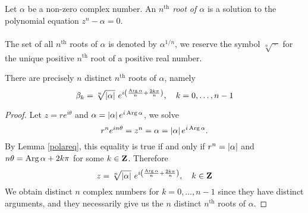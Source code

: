 \medskip

\begin{definition}[Roots]
Let $\alpha$ be a non-zero complex number. An \emph{$n^{\text{th}}$ root of $\alpha$} is a solution to the polynomial equation $z^n - \alpha = 0$.\\
\\
The set of all $n^{\text{th}}$ roots of $\alpha$ is denoted by $\alpha^{1/n}$, we reserve the symbol $\sqrt[n]{\ \cdot\ }$ for the unique positive $n^{\text{th}}$ root of a positive real number.
\end{definition}

\medskip

\begin{proposition}\label{distroot}
There are precisely $n$ distinct $n^{\text{th}}$ roots of $\alpha$, namely
\[\beta_k = \sqrt[n]{\abs{\alpha}}\ e^{i\left(\frac{\parg \alpha}{n} + \frac{2k\pi}{n}\right)},\quad k = 0,\ldots,n-1\]
\end{proposition}
\begin{proof}
Let $z = re^{i\theta}$ and $\alpha = \left\lvert\alpha\right\rvert e^{i\operatorname{Arg}\alpha}$, we solve
\[r^ne^{in\theta} = z^n = \alpha = \left\lvert\alpha\right\rvert e^{i\operatorname{Arg}\alpha}.\]
By Lemma \ref{polareq}, this equality is true if and only if $r^n = \left\lvert\alpha\right\rvert$ and $n\theta = \operatorname{Arg}\alpha + 2k\pi$ for some $k \in \mathbf Z$. Therefore
\[z = \sqrt[n]{\left\lvert\alpha\right\rvert}\ e^{i\left(\frac{\operatorname{Arg} \alpha}{n} + \frac{2k\pi}{n}\right)},\quad k \in \mathbf Z\]
We obtain distinct $n$ complex numbers for $k = 0,\ldots,n-1$ since they have distinct arguments, and they necessarily give us the $n$ distinct $n^{\text{th}}$ roots of $\alpha$.
\end{proof}

\medskip

